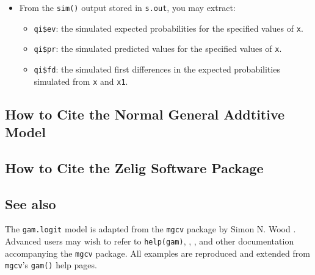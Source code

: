 \begin{itemize}
\item From the {\tt sim()} output stored in {\tt s.out}, you may extract:
\begin{itemize}
\item {\tt qi\$ev}: the simulated expected probabilities for the specified values of {\tt x}.
\item {\tt qi\$pr}: the simulated predicted values for the specified values of {\tt x}.
\item {\tt qi\$fd}: the simulated first differences in the expected probabilities simulated from {\tt x} and {\tt x1}.
\end{itemize}
\end{itemize}

\subsection*{How to Cite the Normal General Addtitive Model}

\subsection*{How to Cite the Zelig Software Package}
\CiteZelig

\subsection* {See also}
The {\tt gam.logit} model is adapted from the  {\tt mgcv} package by Simon N. Wood \citep{Wood06}. Advanced users may wish to refer to {\tt help(gam)},  \cite{Wood04}, \cite{Wood00}, and other documentation accompanying the {\tt mgcv} package. All examples are reproduced and extended from {\tt mgcv}'s {\tt gam()} help pages.




